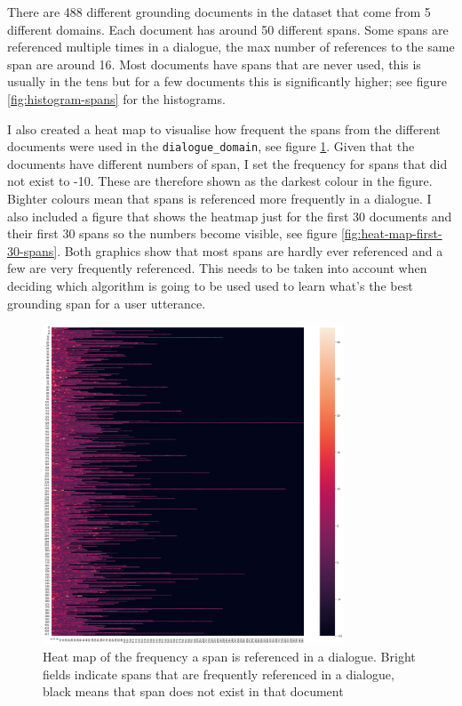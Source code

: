 \documentclass[11pt]{article}
\begin{document}
    There are 488 different grounding documents in the dataset that come from 5 different domains. Each document has
    around 50 different spans. Some spans are referenced multiple times in a dialogue, the max number of references
    to the same span are around 16. Most documents have spans that are never used, this is usually in the tens but for a few documents
    this is significantly higher; see figure \ref{fig:histogram-spans} for the histograms.

    I also created a heat map to visualise how frequent the spans from the different documents were used in the \texttt{dialogue\_domain},
    see figure \ref{fig:heat-map-all-spans}. Given that the documents have different numbers of span, I set the frequency for spans that did not exist to -10. These
    are therefore shown as the darkest colour in the figure. Bighter colours mean that spans is referenced more frequently in a
    dialogue. I also included a figure that shows the heatmap just for the first 30 documents and their first 30 spans
    so the numbers become visible, see figure \ref{fig:heat-map-first-30-spans}. Both graphics show that most spans
    are hardly ever referenced and a few are very frequently referenced. This needs to be taken into account when
    deciding which algorithm is going to be used used to learn what's the best grounding span for a user utterance.

    \begin{figure}[h]
        \centering
        \includegraphics[width=0.8\textwidth]{sparsity_of_spans}
        \caption{Heat map of the frequency a span is referenced in a dialogue. Bright fields indicate spans that are frequently
        referenced in a dialogue, black means that span does not exist in that document}
        \label{fig:heat-map-all-spans}
    \end{figure}
\end{document}
